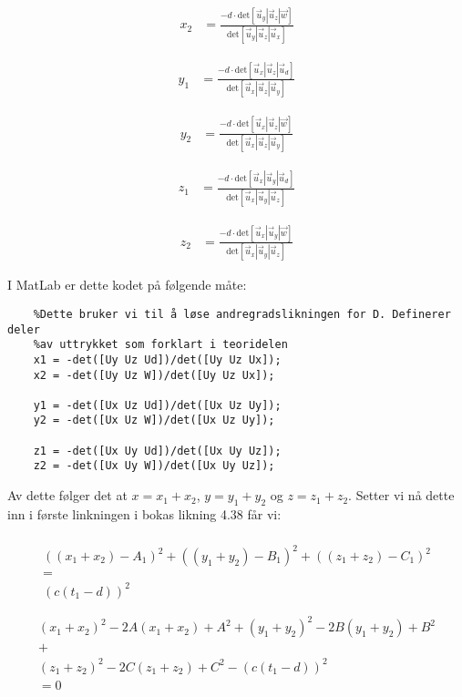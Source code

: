 \begin{align}
	x_2&=\frac{-d\cdot\text{det}[\vec{u}_y|\vec{u}_z | \vec{w}]}{\text{det}[\vec{u}_y|\vec{u}_z | \vec{u}_x]}\nonumber 
\end{align}

\begin{align}
	y_1&=\frac{-d\cdot\text{det}[\vec{u}_x|\vec{u}_z | \vec{u}_d]}{\text{det}[\vec{u}_x|\vec{u}_z | \vec{u}_y]}\nonumber 
\end{align}

\begin{align}
    y_2&=\frac{-d\cdot\text{det}[\vec{u}_x|\vec{u}_z | \vec{w}]}{\text{det}[\vec{u}_x|\vec{u}_z | \vec{u}_y]}\nonumber 
\end{align}

\begin{align}
    z_1&=\frac{-d\cdot\text{det}[\vec{u}_x|\vec{u}_y | \vec{u}_d]}{\text{det}[\vec{u}_x|\vec{u}_y | \vec{u}_z]}\nonumber
\end{align}

\begin{align}
    z_2&=\frac{-d\cdot\text{det}[\vec{u}_x|\vec{u}_y | \vec{w}]}{\text{det}[\vec{u}_x|\vec{u}_y | \vec{u}_z]}\nonumber 
\end{align}

I MatLab er dette kodet på følgende måte: 
\begin{lstlisting}
	%Dette bruker vi til å løse andregradslikningen for D. Definerer deler 
	%av uttrykket som forklart i teoridelen 
	x1 = -det([Uy Uz Ud])/det([Uy Uz Ux]);
	x2 = -det([Uy Uz W])/det([Uy Uz Ux]);

	y1 = -det([Ux Uz Ud])/det([Ux Uz Uy]);
	y2 = -det([Ux Uz W])/det([Ux Uz Uy]);

	z1 = -det([Ux Uy Ud])/det([Ux Uy Uz]);
	z2 = -det([Ux Uy W])/det([Ux Uy Uz]);
\end{lstlisting} 

Av dette følger det at $x=x_1+x_2$, $y=y_1+y_2$ og $z=z_1+z_2$. Setter vi nå dette inn i første linkningen i bokas likning 4.38 får vi: 

\begin{multline}
	\\
    ((x_1+x_2)-A_1)^2+((y_1+y_2)-B_1)^2+((z_1+z_2)-C_1)^2\\
    =\\
    (c(t_1-d))^2 \\\nonumber
\end{multline}
\begin{multline}
	\\
  (x_1+x_2)^2-2A(x_1+x_2)+A^2+(y_1+y_2)^2-2B(y_1+y_2)+B^2\\
    +\\
    (z_1+z_2)^2-2C(z_1+z_2)+C^2-(c(t_1-d))^2\\
    =0 \nonumber 	\\
\end{multline}

